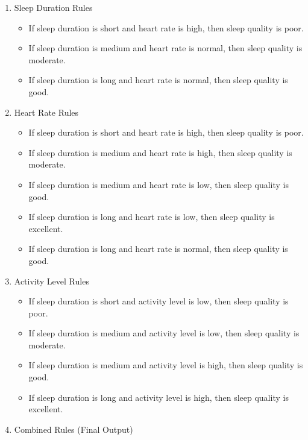 \documentclass[10pt,twocolumn]{article}
\begin{document}
\begin{enumerate}
    \item Sleep Duration Rules
        \begin{itemize}
            \item If sleep duration is short and heart rate is high, then sleep quality is poor.
            \item If sleep duration is medium and heart rate is normal, then sleep quality is moderate.
            \item If sleep duration is long and heart rate is normal, then sleep quality is good.
        \end{itemize}
    \item Heart Rate Rules
        \begin{itemize}
            \item If sleep duration is short and heart rate is high, then sleep quality is poor.
            \item If sleep duration is medium and heart rate is high, then sleep quality is moderate.
            \item If sleep duration is medium and heart rate is low, then sleep quality is good.
            \item If sleep duration is long and heart rate is low, then sleep quality is excellent.
            \item If sleep duration is long and heart rate is normal, then sleep quality is good.
        \end{itemize}
    \item Activity Level Rules
        \begin{itemize}
            \item If sleep duration is short and activity level is low, then sleep quality is poor.
            \item If sleep duration is medium and activity level is low, then sleep quality is moderate.
            \item If sleep duration is medium and activity level is high, then sleep quality is good.
            \item If sleep duration is long and activity level is high, then sleep quality is excellent.
        \end{itemize}
    \item Combined Rules (Final Output)
    

\end{enumerate}
\end{document}
